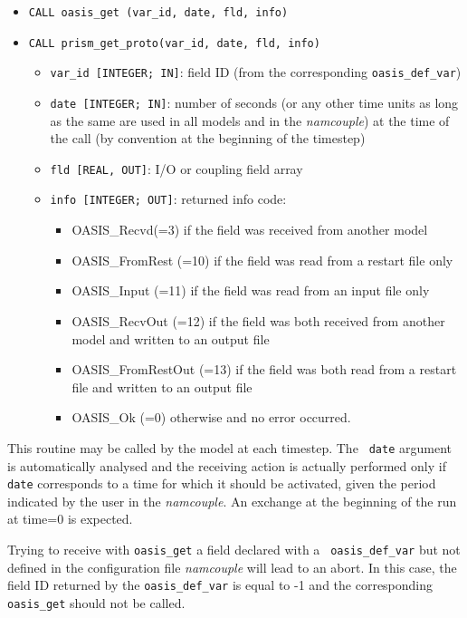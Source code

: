 \begin{itemize}
 
\item {\tt CALL oasis\_get (var\_id, date, fld, info)}
\item {\tt CALL prism\_get\_proto(var\_id, date, fld, info)}
  \begin{itemize}
  \item {\tt var\_id [INTEGER; IN]}: field ID (from the corresponding
    {\tt oasis\_def\_var})
  \item {\tt date [INTEGER; IN]}: number of seconds (or any other time
    units as long as the same are used in all models and in the {\it
      namcouple}) at the time of the call (by convention at the
    beginning of the timestep)
  \item {\tt fld [REAL, OUT]}: I/O or coupling field array
  \item {\tt info [INTEGER; OUT]}: returned info code:
    \begin{itemize}
    \item OASIS\_Recvd(=3) if the field was received from another
      model
    \item OASIS\_FromRest (=10) if the field was read from a restart
      file only
    \item OASIS\_Input (=11) if the field was read from an input file
      only
    \item OASIS\_RecvOut (=12) if the field was both received from
      another model and written to an output file
    \item OASIS\_FromRestOut (=13) if the field was both read from a
      restart file and written to an output file
    \item OASIS\_Ok (=0) otherwise and no error occurred.
    \end{itemize}
  \end{itemize}
\end{itemize}

This routine may be called by the model at each timestep. The {\tt
  date} argument is automatically analysed and the receiving action is
actually performed only if {\tt date} corresponds to a time for which
it should be activated, given the period indicated by the user in the
{\it namcouple}. An exchange at the beginning of the run at time=0 is
expected.

Trying to receive with {\tt oasis\_get} a field declared with a {\tt
  oasis\_def\_var} but not defined in the configuration file {\it
  namcouple} will lead to an abort. In this case, the field ID
returned by the {\tt oasis\_def\_var} is equal to -1 and the
corresponding {\tt oasis\_get} should not be called.

